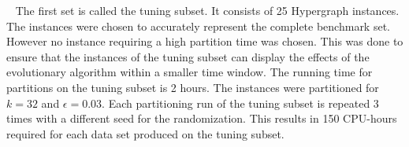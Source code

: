 \documentclass[a4paper,12pt,titlepage, BCOR7mm,headsepline]{scrbook}
\numberwithin{equation}{section}
\begin{document}


\newline ~\newline
The first set is called the tuning subset. It consists of 25 Hypergraph instances. The instances were chosen to accurately represent the complete benchmark set. However no instance requiring a high partition time was chosen. This was done to ensure that the instances of the tuning subset can display the effects of the evolutionary algorithm within a smaller time window. The running time for partitions on the tuning subset is 2 hours. The instances were partitioned for $k = 32$ and $\epsilon = 0.03$. Each partitioning run of the tuning subset is repeated 3 times with a different seed for the randomization. This results in 150 CPU-hours required for each data set produced on the tuning subset.
\newline
\end{document}
